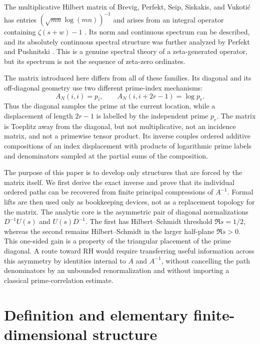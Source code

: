 \documentclass[11pt]{amsart}
\numberwithin{equation}{section}
\theoremstyle{plain}
\theoremstyle{definition}
\theoremstyle{remark}
\begin{document}
The multiplicative Hilbert matrix of Brevig, Perfekt, Seip, Siskakis, and Vukoti\'c has entries $(\sqrt{mn}\log(mn))^{-1}$ and arises from an integral operator containing $\zeta(s+w)-1$ \cite{BrevigEtAl2016}.  Its norm and continuous spectrum can be described, and its absolutely continuous spectral structure was further analyzed by Perfekt and Pushnitski \cite{PerfektPushnitski2018}.  This is a genuine spectral theory of a zeta-generated operator, but its spectrum is not the sequence of zeta-zero ordinates.

The matrix introduced here differs from all of these families.  Its diagonal and its off-diagonal geometry use two different prime-index mechanisms:
\begin{equation}
A_N(i,i)=p_i,
\qquad
A_N(i,i+2r-1)=\log p_r.
\label{eq:intro_matrix}
\end{equation}
Thus the diagonal samples the prime at the current location, while a displacement of length $2r-1$ is labelled by the independent prime $p_r$.  The matrix is Toeplitz away from the diagonal, but not multiplicative, not an incidence matrix, and not a primewise tensor product.  Its inverse couples ordered additive compositions of an index displacement with products of logarithmic prime labels and denominators sampled at the partial sums of the composition.

The purpose of this paper is to develop only structures that are forced by the matrix itself.  We first derive the exact inverse and prove that its individual ordered paths can be recovered from finite principal compressions of $A^{-1}$.  Formal lifts are then used only as bookkeeping devices, not as a replacement topology for the matrix.  The analytic core is the asymmetric pair of diagonal normalizations $D^{-1}U(s)$ and $U(s)D^{-1}$.  The first has Hilbert--Schmidt threshold $\Re s=1/2$, whereas the second remains Hilbert--Schmidt in the larger half-plane $\Re s>0$.  This one-sided gain is a property of the triangular placement of the prime diagonal.  A route toward RH would require transferring useful information across this asymmetry by identities internal to $A$ and $A^{-1}$, without cancelling the path denominators by an unbounded renormalization and without importing a classical prime-correlation estimate.

\section{Definition and elementary finite-dimensional structure}
\label{sec:definition}
\end{document}
